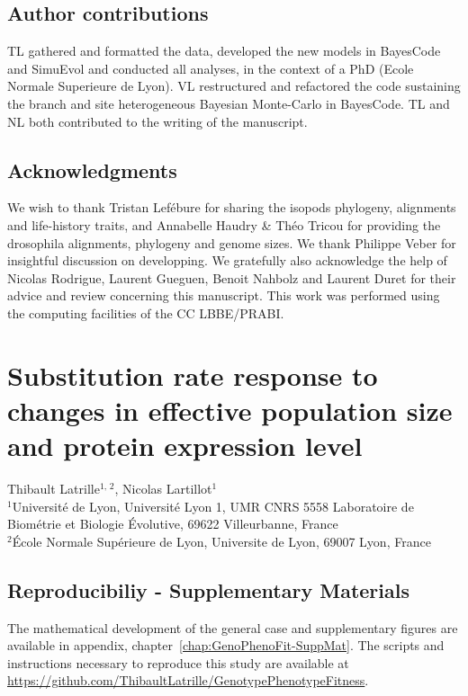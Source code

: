 \documentclass[a4paper,oneside,nobind]{thesis}
\begin{document}
\section{Author contributions}
TL gathered and formatted the data, developed the new models in BayesCode and SimuEvol and conducted all analyses, in the context of a PhD (Ecole Normale Superieure de Lyon).
VL restructured and refactored the code sustaining the branch and site heterogeneous Bayesian Monte-Carlo in BayesCode.
TL and NL both contributed to the writing of the manuscript.

\section{Acknowledgments}
We wish to thank Tristan Lefébure for sharing the isopods phylogeny, alignments and life-history traits, and Annabelle Haudry \& Théo Tricou for providing the drosophila alignments, phylogeny and genome sizes.
We thank Philippe Veber for insightful discussion on developping.
We gratefully also acknowledge the help of Nicolas Rodrigue, Laurent Gueguen, Benoit Nahbolz and Laurent Duret for their advice and review concerning this manuscript.
This work was performed using the computing facilities of the CC LBBE/PRABI.

\thispagestyle{empty}
\chapter[Substitution rate susceptibility]{Substitution rate response to changes in effective population size and protein expression level}
\label{chap:GenoPhenoFit}

\begin{center}
	\Large Thibault Latrille$^{\text{1, 2}}$, Nicolas Lartillot$^{\text{1}}$\\
	\vspace{0.5cm}
	\normalsize
	$^{\text{1}}$Université de Lyon, Université Lyon 1, UMR CNRS 5558 Laboratoire de Biométrie et Biologie Évolutive, 69622 Villeurbanne, France\\
	$^{\text{2}}$École Normale Supérieure de Lyon, Universite de Lyon, 69007 Lyon, France\\
\end{center}

{\hypersetup{linkcolor=GREYDARK}\minitoc}



\section{Reproducibiliy - Supplementary Materials}
The mathematical development of the general case and supplementary figures are available in appendix, chapter~\ref{chap:GenoPhenoFit-SuppMat}.
The scripts and instructions necessary to reproduce this study are available at \url{https://github.com/ThibaultLatrille/GenotypePhenotypeFitness}.
\end{document}
